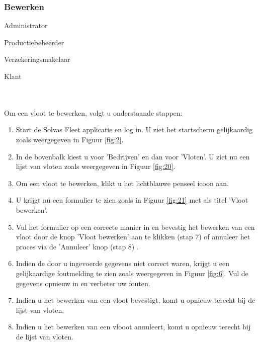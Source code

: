 \documentclass[11pt,openany]{article}
\newcommand{\cmark}{\ding{51}}%
\newcommand{\xmark}{\ding{55}}%
\newcommand{\done}{\rlap{$\square$}{\raisebox{2pt}{\large\hspace{1pt}\cmark}}%
	\hspace{-2.5pt}}
\newcommand{\wontfix}{\rlap{$\square$}{\large\hspace{1pt}\xmark}}
\begin{document}
\subsubsection{Bewerken}
\begin{todolist}
	\item[\done] Administrator
	\item[\done] Productiebeheerder
	\item[\done] Verzekeringsmakelaar
	\item[\wontfix] Klant 
\end{todolist}
\\
\\
Om een vloot te bewerken, volgt u onderstaande stappen:
\begin{enumerate}
	\item Start de Solvas Fleet applicatie en log in. U ziet het startscherm gelijkaardig zoals weergegeven in Figuur \ref{fig:2}.
	\item In de bovenbalk kiest u voor 'Bedrijven' en dan voor 'Vloten'. U ziet nu een lijst van vloten zoals weergegeven in Figuur \ref{fig:20}.
	\item Om een vloot te bewerken, klikt u het lichtblauwe penseel icoon aan. 
	\item U krijgt nu een formulier te zien zoals in Figuur \ref{fig:21} met als titel 'Vloot bewerken'.
	\item Vul het formulier op een correcte manier in en bevestig het bewerken van een vloot door de knop 'Vloot bewerken' aan te klikken (stap 7) of annuleer het proces via de 'Annuleer' knop (stap 8) .
	\item Indien de door u ingevoerde gegevens niet correct waren, krijgt u een gelijkaardige foutmelding te zien zoals weergegeven in Figuur \ref{fig:6}. Vul de gegevens opnieuw in en verbeter uw fouten.
	\item Indien u het bewerken van een vloot bevestigt, komt u opnieuw terecht bij de lijst van vloten. 
	\item Indien u het bewerken van een vlooot annuleert, komt u opnieuw terecht bij de lijst van vloten.
	
\end{enumerate}
\end{document}
